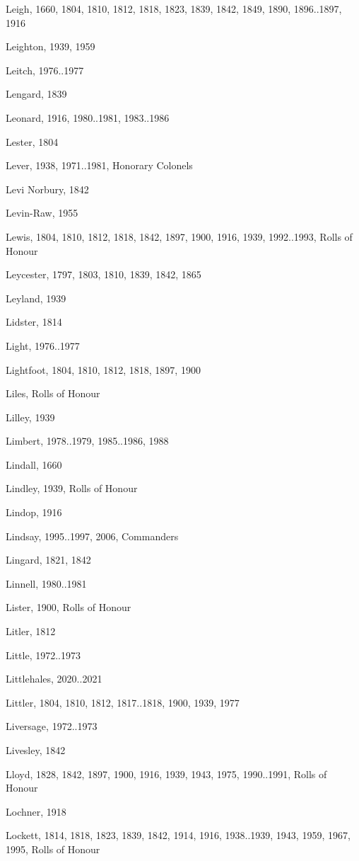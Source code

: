 \begin{theindex}
\item Leigh, 1660, 1804, 1810, 1812, 1818, 1823, 1839, 1842, 1849, 1890, 1896..1897, 1916
\item Leighton, 1939, 1959
\item Leitch, 1976..1977
\item Lengard, 1839
\item Leonard, 1916, 1980..1981, 1983..1986
\item Lester, 1804
\item Lever, 1938, 1971..1981, Honorary Colonels
\item Levi Norbury, 1842
\item Levin-Raw, 1955
\item Lewis, 1804, 1810, 1812, 1818, 1842, 1897, 1900, 1916, 1939, 1992..1993, Rolls of Honour
\item Leycester, 1797, 1803, 1810, 1839, 1842, 1865
\item Leyland, 1939
\item Lidster, 1814
\item Light, 1976..1977
\item Lightfoot, 1804, 1810, 1812, 1818, 1897, 1900
\item Liles, Rolls of Honour
\item Lilley, 1939
\item Limbert, 1978..1979, 1985..1986, 1988
\item Lindall, 1660
\item Lindley, 1939, Rolls of Honour
\item Lindop, 1916
\item Lindsay, 1995..1997, 2006, Commanders
\item Lingard, 1821, 1842
\item Linnell, 1980..1981
\item Lister, 1900, Rolls of Honour
\item Litler, 1812
\item Little, 1972..1973
\item Littlehales, 2020..2021
\item Littler, 1804, 1810, 1812, 1817..1818, 1900, 1939, 1977
\item Liversage, 1972..1973
\item Livesley, 1842
\item Lloyd, 1828, 1842, 1897, 1900, 1916, 1939, 1943, 1975, 1990..1991, Rolls of Honour
\item Lochner, 1918
\item Lockett, 1814, 1818, 1823, 1839, 1842, 1914, 1916, 1938..1939, 1943, 1959, 1967, 1995, Rolls of Honour

\end{theindex}
